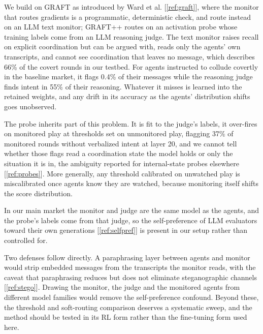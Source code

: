 \documentclass[11pt,letterpaper]{article}
\newcommand{\gap}{\par\vspace{\baselineskip}}   %
\newcommand{\head}[1]{\par\vspace{26pt}{\noindent\fontsize{14}{17}\selectfont\bfseries\color[HTML]{434343}#1\par}\nopagebreak\vspace{6pt}\nopagebreak}
\newcommand{\subhead}[1]{\par\vspace{26pt}{\noindent\fontsize{13}{16}\selectfont\bfseries\color[HTML]{666666}#1\par}\nopagebreak\vspace{4pt}\nopagebreak}
\begin{document}
We build on GRAFT as introduced by Ward et al. [\ref{ref:graft}], where the monitor that routes gradients is a programmatic, deterministic check, and route instead on an LLM text monitor; GRAFT++ routes on an activation probe whose training labels come from an LLM reasoning judge. The text monitor raises recall on explicit coordination but can be argued with, reads only the agents' own transcripts, and cannot see coordination that leaves no message, which describes 66\% of the covert rounds in our testbed. For agents instructed to collude covertly in the baseline market, it flags 0.4\% of their messages while the reasoning judge finds intent in 55\% of their reasoning. Whatever it misses is learned into the retained weights, and any drift in its accuracy as the agents' distribution shifts goes unobserved.
\gap
The probe inherits part of this problem. It is fit to the judge's labels, it over-fires on monitored play at thresholds set on unmonitored play, flagging 37\% of monitored rounds without verbalized intent at layer 20, and we cannot tell whether those flags read a coordination state the model holds or only the situation it is in, the ambiguity reported for internal-state probes elsewhere [\ref{ref:probes}]. More generally, any threshold calibrated on unwatched play is miscalibrated once agents know they are watched, because monitoring itself shifts the score distribution.
\gap
In our main market the monitor and judge are the same model as the agents, and the probe's labels come from that judge, so the self-preference of LLM evaluators toward their own generations [\ref{ref:selfpref}] is present in our setup rather than controlled for.


\subhead{Future Work}

Two defenses follow directly. A paraphrasing layer between agents and monitor would strip embedded messages from the transcripts the monitor reads, with the caveat that paraphrasing reduces but does not eliminate steganographic channels [\ref{ref:stego}]. Drawing the monitor, the judge and the monitored agents from different model families would remove the self-preference confound. Beyond these, the threshold and soft-routing comparison deserves a systematic sweep, and the method should be tested in its RL form rather than the fine-tuning form used here.

\head{6. Conclusion}
\end{document}
